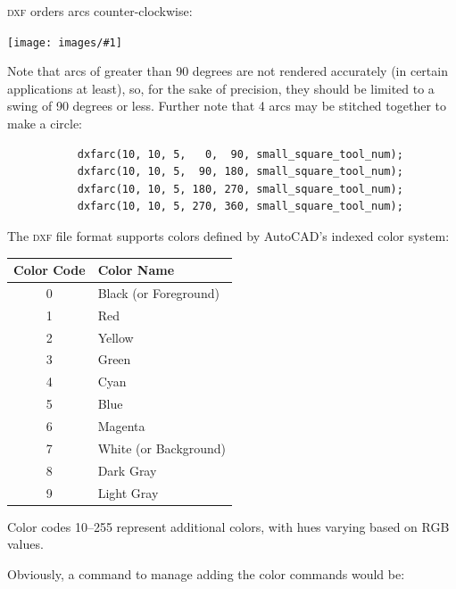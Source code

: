 \documentclass{ltxdoc}
\newcommand{\includeimage}[1]{\bigskip\noindent\texttt{[image: images/\#1]}\bigskip}
\begin{document}
\textsc{dxf} orders arcs counter-clockwise:

\includeimage{arcs_circle_degrees.pdf}%

Note that arcs of greater than 90 degrees are not rendered accurately (in certain applications at least), so, for the sake of precision, they should be limited to a swing of 90 degrees or less. Further note that 4 arcs may be stitched together to make a circle:
 
\begin{verbatim}
           dxfarc(10, 10, 5,   0,  90, small_square_tool_num);
           dxfarc(10, 10, 5,  90, 180, small_square_tool_num);
           dxfarc(10, 10, 5, 180, 270, small_square_tool_num);
           dxfarc(10, 10, 5, 270, 360, small_square_tool_num);
\end{verbatim}
 
%
%

The \textsc{dxf} file format supports colors defined by AutoCAD's indexed color system:

\begin{center}
\noindent\begin{tabular}{cl}
Color Code & Color Name \\
\toprule
     0 & Black (or Foreground)  \\
     1 & Red \\
     2 & Yellow \\
     3 & Green  \\
     4 & Cyan  \\
     5 & Blue \\
     6 & Magenta \\ 
     7 & White (or Background)\\
     8 & Dark Gray \\ 
     9 & Light Gray \\\bottomrule
\end{tabular}
\end{center}

Color codes 10--255 represent additional colors, with hues varying based on RGB values.

Obviously, a command to manage adding the color commands would be:
\end{document}
